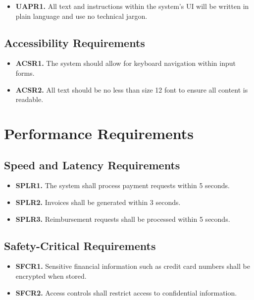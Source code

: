 \documentclass[12pt]{article}
\begin{document}
\label{UAPR}

\begin{itemize}
    \item \textbf{UAPR1.} All text and instructions within the system's UI will be written in plain language and use no technical jargon.
\end{itemize}

\subsection{Accessibility Requirements}

\label{ACSR}

\begin{itemize}
    \item \textbf{ACSR1.} The system should allow for keyboard navigation within input forms.
    \item \textbf{ACSR2.} All text should be no less than size 12 font to ensure all content is readable.
\end{itemize}

\section{Performance Requirements}

\label{PerformanceReq}

\subsection{Speed and Latency Requirements}

\label{SPLR}

\begin{itemize}
    \item \textbf{SPLR1.} The system shall process payment requests within 5 seconds.
    \item \textbf{SPLR2.} Invoices shall be generated within 3 seconds.
    \item \textbf{SPLR3.} Reimbursement requests shall be processed within 5 seconds.
\end{itemize}

\subsection{Safety-Critical Requirements}

\label{SFCR}

\begin{itemize}
    \item \textbf{SFCR1.} Sensitive financial information such as credit card numbers shall be encrypted when stored.
    \item \textbf{SFCR2.} Access controls shall restrict access to confidential information.
\end{itemize}
\end{document}
